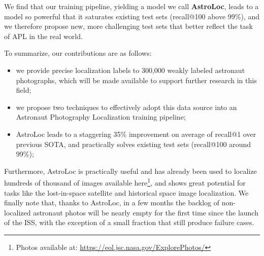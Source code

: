 We find that our training pipeline, yielding a model we call \textbf{AstroLoc}, leads to a model so powerful that it saturates existing test sets (recall@100 above 99\%), and we therefore propose new, more challenging test sets that better reflect the task of APL in the real world.

To summarize, our contributions are as follows:

\begin{itemize}
    \item we provide precise localization labels to 300,000 weakly labeled astronaut photographs, which will be made available to support further research in this field;
    \item we propose two techniques to effectively adopt this data source into an Astronaut Photography Localization training pipeline;
    \item AstroLoc leads to a staggering 35\% improvement on average of recall@1 over previous SOTA, and practically solves existing test sets (recall@100 around 99\%);
\end{itemize}
Furthermore, AstroLoc is practically useful and has already been used to localize hundreds of thousand of images available here\footnote{Photos available at: \url{https://eol.jsc.nasa.gov/ExplorePhotos/}
}, and shows great potential for tasks like the lost-in-space satellite and historical space image localization.
We finally note that, thanks to AstroLoc, in a few months the backlog of non-localized astronaut photos will be nearly empty for the first time since the launch of the ISS, with the exception of a small fraction that still produce failure cases.











